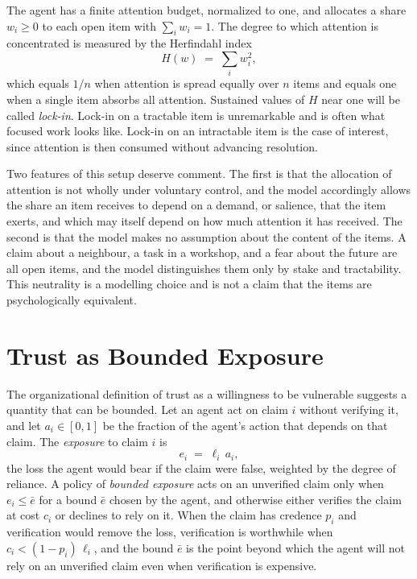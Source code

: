 \documentclass[11pt]{article}
\theoremstyle{definition}
\begin{document}
The agent has a finite attention budget, normalized to one, and allocates a share $w_i\ge 0$ to each open item with $\sum_i w_i=1$. The degree to which attention is concentrated is measured by the Herfindahl index
\begin{equation}
H(w)\;=\;\sum_i w_i^{2},
\label{eq:herfindahl}
\end{equation}
which equals $1/n$ when attention is spread equally over $n$ items and equals one when a single item absorbs all attention. Sustained values of $H$ near one will be called \emph{lock-in}. Lock-in on a tractable item is unremarkable and is often what focused work looks like. Lock-in on an intractable item is the case of interest, since attention is then consumed without advancing resolution.

Two features of this setup deserve comment. The first is that the allocation of attention is not wholly under voluntary control, and the model accordingly allows the share an item receives to depend on a demand, or salience, that the item exerts, and which may itself depend on how much attention it has received. The second is that the model makes no assumption about the content of the items. A claim about a neighbour, a task in a workshop, and a fear about the future are all open items, and the model distinguishes them only by stake and tractability. This neutrality is a modelling choice and is not a claim that the items are psychologically equivalent.

\section{Trust as Bounded Exposure}
\label{sec:trust}

The organizational definition of trust as a willingness to be vulnerable \cite{mayer1995} suggests a quantity that can be bounded. Let an agent act on claim $i$ without verifying it, and let $a_i\in[0,1]$ be the fraction of the agent's action that depends on that claim. The \emph{exposure} to claim $i$ is
\begin{equation}
e_i\;=\;\ell_i\,a_i,
\label{eq:exposure}
\end{equation}
the loss the agent would bear if the claim were false, weighted by the degree of reliance. A policy of \emph{bounded exposure} acts on an unverified claim only when $e_i\le\bar e$ for a bound $\bar e$ chosen by the agent, and otherwise either verifies the claim at cost $c_i$ or declines to rely on it. When the claim has credence $p_i$ and verification would remove the loss, verification is worthwhile when $c_i<(1-p_i)\,\ell_i$, and the bound $\bar e$ is the point beyond which the agent will not rely on an unverified claim even when verification is expensive.
\end{document}

